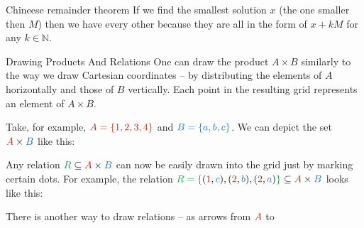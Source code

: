 \documentclass[final]{beamer}
\newlength{\colwidth}
\newcommand{\clr}{\textcolor{BrickRed}}
\newcommand{\clb}{\textcolor{RoyalBlue}}
\newcommand{\clg}{\textcolor{ForestGreen}}
\newcommand{\N}{\mathbb{N}}
\begin{document}
\begin{frame}[t]
\begin{columns}[t]
\begin{column}{\colwidth}
\begin{alertblock}{Chineese remainder theorem}
If we find the smallest solution $x$ (the one smaller then $M$) then we have
every other because they are all in the form of $x + kM$ for any $k \in \N$. 
 
 \end{alertblock}

\begin{block}{Drawing Products And Relations}
 One can draw the product $A \times B$ similarly to the way we draw Cartesian
 coordinates -- by distributing the elements of $A$ horizontally and those of
 $B$ vertically. Each point in the resulting grid represents an element of $A
 \times B$.

 Take, for example, $\clr{A = \{1, 2, 3, 4\}}$ and $\clb{B = \{a, b, c\}}$. We
 can depict the set $\clr{A} \times \clb{B}$ like this:
 \begin{center}
 \end{center}
 Any relation $\clg{R} \subseteq \clr{A} \times \clb{B}$ can now be easily drawn
 into the grid just by marking certain dots. For example, the relation $\clg{R =
 \{}(\clr{1},\clb{c}), (\clr{2},\clb{b}),(\clr{2},\clb{a})\clg{\}} \subseteq
 \clr{A} \times \clb{B}$ looks like this:
 \begin{center}
 \end{center}
 There is another way to draw relations -- as arrows from $\clr{A}$ to

\end{block}
\end{column}
\end{columns}
\end{frame}
\end{document}
